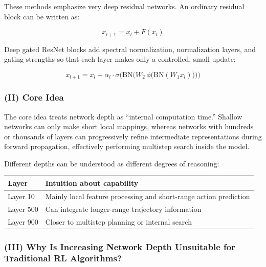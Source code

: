 These methods emphasize very deep residual networks. An ordinary residual block can be written as:

\[
x_{l+1}=x_l+F(x_l)
\]

Deep gated ResNet blocks add spectral normalization, normalization layers, and gating strengths so that each layer makes only a controlled, small update:

\[
x_{l+1}
=
x_l
+
\alpha_l\cdot
\sigma
\bigl(
\mathrm{BN}
\bigl(
W_2\,
\phi
\bigl(
\mathrm{BN}(W_1x_l)
\bigr)
\bigr)
\bigr)
\]

\hypertarget{ii-core-idea}{%
\subsubsection{(II) Core Idea}\label{ii-core-idea}}

The core idea treats network depth as ``internal computation time.'' Shallow networks can only make short local mappings, whereas networks with hundreds or thousands of layers can progressively refine intermediate representations during forward propagation, effectively performing multistep search inside the model.

Different depths can be understood as different degrees of reasoning:

\begin{longtable}[]{@{}
  >{\raggedright\arraybackslash}p{}
  >{\raggedright\arraybackslash}p{}@{}}
\toprule
Layer & Intuition about capability \\
\midrule
\endhead
Layer 10 & Mainly local feature processing and short-range action prediction \\
Layer 500 & Can integrate longer-range trajectory information \\
Layer 900 & Closer to multistep planning or internal search \\
\bottomrule
\end{longtable}

\hypertarget{iii-why-is-increasing-network-depth-unsuitable-for-traditional-rl-algorithms}{%
\subsubsection{(III) Why Is Increasing Network Depth Unsuitable for Traditional RL Algorithms?}\label{iii-why-is-increasing-network-depth-unsuitable-for-traditional-rl-algorithms}}

